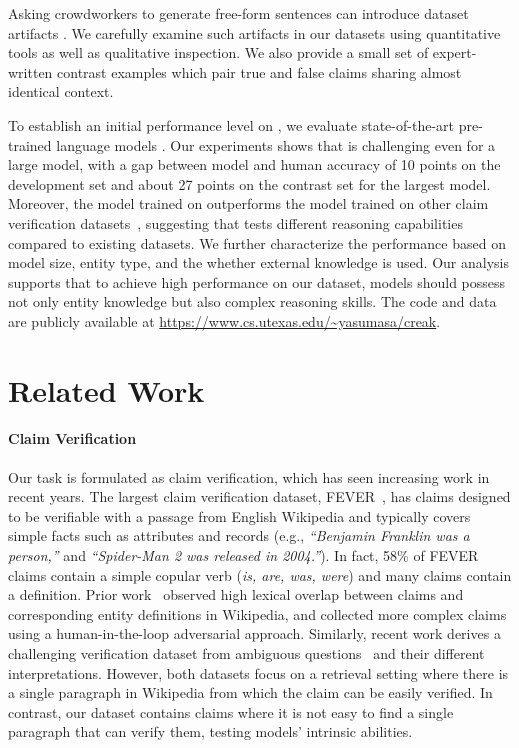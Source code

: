 Asking crowdworkers to generate free-form sentences can introduce dataset artifacts \citep{Suchin_Gururangan_2018, Mor_Geva_2019}. We carefully examine such artifacts in our datasets using quantitative tools \citep{Swabha_Swayamdipta_2020,Matt_Gardner_2020} as well as qualitative inspection. We also provide a small set of expert-written contrast examples \citep{Divyansh_Kaushik_2019,Matt_Gardner_2020} which pair true and false claims sharing almost identical context.  

To establish an initial performance level on \oursno, we evaluate state-of-the-art pre-trained language models \citep{Yinhan_Liu_19,T5}. Our experiments shows that \ours is challenging even for a large model, with a gap between model and human accuracy of 10 points on the development set and about 27 points on the contrast set for the largest model. Moreover, the model trained on \ours outperforms the model trained on other claim verification datasets~\citep{fever,Julian_Eisenschlos_2021,Jungsoo_Park_2021}, suggesting that \ours tests different reasoning capabilities compared to existing datasets. We further characterize the performance based on model size, entity type, and the whether external knowledge is used. Our analysis supports that to achieve high performance on our dataset, models should possess not only entity knowledge but also complex reasoning skills. The code and data are publicly available at \url{https://www.cs.utexas.edu/~yasumasa/creak}.

\section{Related Work}\label{sec:related-work} 

\paragraph{Claim Verification}
Our task is formulated as claim verification, which has seen increasing work in recent years. The largest claim verification dataset, FEVER~\citep{fever}, has claims designed to be verifiable with a passage from English Wikipedia and typically covers simple facts such as attributes and records (e.g., \emph{``Benjamin Franklin was a person,''} and \emph{``Spider-Man 2 was released in 2004.''}). In fact, 58\% of FEVER claims contain a simple copular verb ({\it is, are, was, were}) and many claims contain a definition. Prior work~\citep{Julian_Eisenschlos_2021} observed high lexical overlap between claims and corresponding entity definitions in Wikipedia, and collected more complex claims using a human-in-the-loop adversarial approach. Similarly, recent work \citep{Jungsoo_Park_2021} derives a challenging verification dataset from ambiguous questions~\citep{Sewon_Min_2020} and their different interpretations. However, both datasets focus on a retrieval setting where there is a single paragraph in Wikipedia from which the claim can be easily verified. In contrast, our dataset contains claims where it is not easy to find a single paragraph that can verify them, testing models' intrinsic abilities. 

